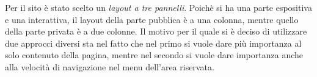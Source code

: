 Per il sito è stato scelto un \textit{layout a tre pannelli}.
Poichè si ha una parte espositiva e una interattiva, il layout della parte pubblica è a una colonna, mentre quello della parte
privata è a due colonne. Il motivo per il quale si è deciso di utilizzare due approcci diversi sta nel fatto che nel primo si vuole dare più
importanza al solo contenuto della pagina, mentre nel secondo si vuole dare importanza anche alla velocità di navigazione nel menu dell'area
riservata.